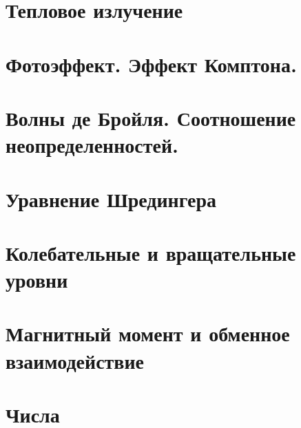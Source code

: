 % 


\section{Тепловое излучение}


\section{Фотоэффект. Эффект Комптона.}


\section{Волны де Бройля. Соотношение неопределенностей.}


\section{Уравнение Шредингера}

\section{Колебательные и вращательные уровни}
 

\section{Магнитный момент и обменное взаимодействие}
 


\newpage
\section{Числа}





\newpage

